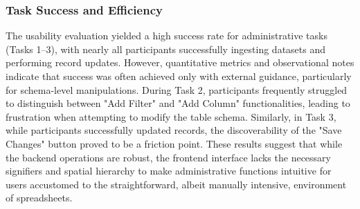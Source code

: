 \documentclass[journal]{./IEEE/IEEEtran}
\begin{document}
\subsubsection{Task Success and Efficiency}

The usability evaluation yielded a high success rate for administrative tasks (Tasks 1--3), with nearly all participants successfully ingesting datasets and performing record updates. However, quantitative metrics and observational notes indicate that success was often achieved only with external guidance, particularly for schema-level manipulations. During Task 2, participants frequently struggled to distinguish between "Add Filter" and "Add Column" functionalities, leading to frustration when attempting to modify the table schema. Similarly, in Task 3, while participants successfully updated records, the discoverability of the "Save Changes" button proved to be a friction point. These results suggest that while the backend operations are robust, the frontend interface lacks the necessary signifiers and spatial hierarchy to make administrative functions intuitive for users accustomed to the straightforward, albeit manually intensive, environment of spreadsheets.

\begin{table}[htbp]
\caption{Task Success and Efficiency Metrics (Aggregated)}
\label{tab:task_performance}
\centering
{}
\end{table}
\end{document}
